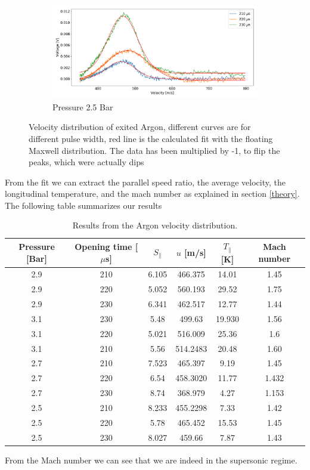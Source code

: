 \documentclass[a4paper,10pt]{article}
\begin{document}
\begin{figure}[H]
  ~
  \begin{subfigure}[t]{0.45 \textwidth}
    \centering
    \includegraphics[width=\textwidth]{tof15}
    \caption{Pressure 2.5 Bar}\label{tof4}
  \end{subfigure}
  \caption{Velocity distribution of exited Argon, different curves are for different pulse width, red line is the calculated fit with the floating Maxwell distribution. The data has been multiplied by -1, to flip the peaks, which were actually dips}
  \label{tof}
\end{figure}

From the fit we can extract the parallel speed ratio, the average velocity, the longitudinal temperature, and the mach number as explained in section \ref{theory}. The following table summarizes our results

\begin{table}[H]
\centering
\begin{tabular}{cccccc} \toprule
Pressure [Bar] & Opening time [$\mu$s] & $S_\parallel$ & $u$ [m/s] & $T_\parallel$ [K] & Mach number \\ \midrule
2.9 & 210 & 6.105 & 466.375& 14.01& 1.45\\
2.9 & 220 & 5.052& 560.193& 29.52& 1.75 \\
2.9 & 230 & 6.341 & 462.517 & 12.77 & 1.44 \\\midrule
3.1 & 230 & 5.48 & 499.63 & 19.930& 1.56\\
3.1 & 220 & 5.021 & 516.009 & 25.36 & 1.6\\
3.1 & 210 & 5.56 & 514.2483 & 20.48 & 1.60 \\\midrule
2.7 & 210 & 7.523 & 465.397 & 9.19& 1.45 \\
2.7 & 220 & 6.54 & 458.3020 & 11.77 & 1.432 \\
2.7 & 230 & 8.74 & 368.979 & 4.27 & 1.153 \\\midrule
2.5 & 210 & 8.233 & 455.2298 & 7.33 & 1.42 \\
2.5 & 220 & 5.78 & 465.452& 15.53 & 1.45 \\
2.5 & 230 & 8.027 & 459.66 & 7.87 & 1.43\\\bottomrule
\end{tabular}
\caption{Results from the Argon velocity distribution.}
\end{table}
From the Mach number we can see that we are indeed in the supersonic regime.
\end{document}
